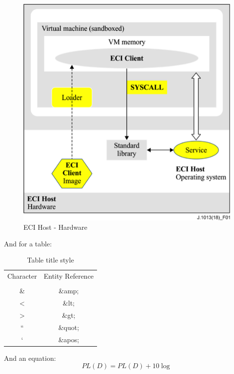 \documentclass[10pt,a4paper,twocolumn]{article}
\begin{document}
\begin{figure}
\includegraphics[width=\columnwidth]{Figure1}
\caption{ECI Host - Hardware}\label{fig:fig1} 
\end{figure}


And for a table:
\begin{table}
\caption{Table title style}\label{tab:tab1} 
\begin{small}
	\begin{tabular}{|c|c|}
		\hline
		Character & Entity Reference\\ 
		& \\
		\hline
		\hline
		\& & \&amp; \\
		\hline
		< & \&lt;\\
		\hline
		> & \&gt; \\
		\hline
		``  & \&quot; \\
		\hline
		` & \&apos; \\
		\hline
	\end{tabular}
\end{small}
\end{table}


And an equation:
\begin{equation}\label{eq:eq1}
	PL(D)=PL(D)+10\log 
\end{equation}
\end{document}
